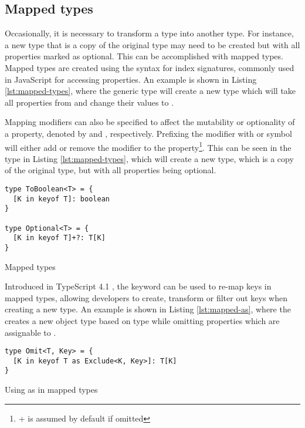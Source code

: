 \subsection{Mapped types}\label{sec:mapped-types}

Occasionally, it is necessary to transform a type into another type. For instance, a new type that is a copy of the original type may need to be created but with all properties marked as optional. This can be accomplished with mapped types. Mapped types are created using the syntax for index signatures, commonly used in JavaScript for accessing properties. An example is shown in Listing \ref{lst:mapped-types}, where the generic type  will create a new type which will take all properties from  and change their values to .

Mapping modifiers can also be specified to affect the mutability or optionality of a property, denoted by  and , respectively. Prefixing the modifier with \code{+} or \code{-} symbol will either add or remove the modifier to the property\footnote{+ is assumed by default if omitted}. This can be seen in the  type in Listing \ref{lst:mapped-types}, which will create a new type, which is a copy of the original type, but with all properties being optional.

\begin{listing}[ht]
  \begin{verbatim}
type ToBoolean<T> = {
  [K in keyof T]: boolean
}

type Optional<T> = {
  [K in keyof T]+?: T[K]
}
\end{verbatim}
  \caption{Mapped types}\label{lst:mapped-types}
\end{listing}

Introduced in TypeScript 4.1 \cite{AnnouncingTypeScript4.1}, the  keyword can be used to re-map keys in mapped types, allowing developers to create, transform or filter out keys when creating a new type. An example is shown in Listing \ref{lst:mapped-as}, where the  creates a new object type based on type  while omitting properties which are assignable to .

\begin{listing}[ht]
  \begin{verbatim}
type Omit<T, Key> = {
  [K in keyof T as Exclude<K, Key>]: T[K]
}
\end{verbatim}
  \caption{Using as in mapped types}\label{lst:mapped-as}
\end{listing}

